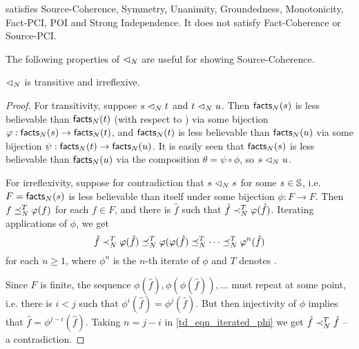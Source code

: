 \begin{theorem}
\label{td_thm_scvoting_axioms}
\scvoting{} satisfies Source-Coherence, Symmetry, Unanimity, Groundedness,
Monotonicity, Fact-PCI, POI and Strong Independence. It does not
satisfy Fact-Coherence or Source-PCI.
\end{theorem}

The following properties of ${\scoh_N}$ are useful for showing
Source-Coherence.

\begin{lemma}
    $\scoh_N$ is transitive and irreflexive.
\end{lemma}

\begin{proof}

For transitivity, suppose $s \scoh_N t$ and $t \scoh_N u$. Then $\facts_N(s)$
is less believable than $\facts_N(t)$ (with respect to \voting{}) via some
bijection $\phi: \facts_N(s) \to \facts_N(t)$, and $\facts_N(t)$ is less
believable than $\facts_N(u)$ via some bijection $\psi: \facts_N(t) \to
\facts_N(u)$. It is easily seen that $\facts_N(s)$ is less believable than
$\facts_N(u)$ via the composition $\theta = \psi \circ \phi$, so $s \scoh_N u$.

For irreflexivity, suppose for contradiction that $s \scoh_N s$ for some $s \in
\S$, i.e. $F = \facts_N(s)$ is less believable than itself under some bijection
$\phi: F \to F$. Then ${f \fle_N^T \phi(f)}$ for each $f \in F$, and there is
$\hat{f}$ such that ${\hat{f} \flt_N^T \phi(\hat{f})}$. Iterating applications
of $\phi$, we get
\begin{equation}
    \label{td_eqn_iterated_phi}
    \hat{f} \flt_N^T \phi(\hat{f}) \fle_N^T \phi(\phi(\hat{f}) \fle_N^T \cdots
    \fle_N^T \phi^n(\hat{f})
\end{equation}
for each $n \ge 1$, where $\phi^n$ is the $n$-th iterate of $\phi$ and $T$
denotes \voting{}.

Since $F$ is finite, the sequence $\phi(\hat{f}), \phi(\phi(\hat{f})), \ldots$
must repeat at some point, i.e. there is $i < j$ such that
$\phi^i(\hat{f}) = \phi^j(\hat{f})$. But then injectivity of $\phi$ implies
that $\hat{f} = \phi^{j - i}(\hat{f})$. Taking $n = j - i$ in
\cref{td_eqn_iterated_phi} we get $\hat{f} \flt_N^T \hat{f}$ -- a contradiction.
\end{proof}

